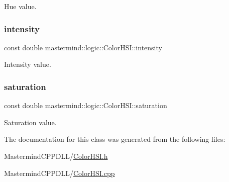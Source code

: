 Hue value. 

\hypertarget{classmastermind_1_1logic_1_1_color_h_s_i_acae1c5e74aae7a627bb1dbcd9f7ee521}{}\label{classmastermind_1_1logic_1_1_color_h_s_i_acae1c5e74aae7a627bb1dbcd9f7ee521} 
\subsubsection{\texorpdfstring{intensity}{intensity}}
{\footnotesize\ttfamily const double mastermind\+::logic\+::\+Color\+H\+S\+I\+::intensity\hspace{0.3cm}{\ttfamily [private]}}



Intensity value. 

\hypertarget{classmastermind_1_1logic_1_1_color_h_s_i_a004dfa3a87c92f9890a7fc64b6b08c8f}{}\label{classmastermind_1_1logic_1_1_color_h_s_i_a004dfa3a87c92f9890a7fc64b6b08c8f} 
\subsubsection{\texorpdfstring{saturation}{saturation}}
{\footnotesize\ttfamily const double mastermind\+::logic\+::\+Color\+H\+S\+I\+::saturation\hspace{0.3cm}{\ttfamily [private]}}



Saturation value. 



The documentation for this class was generated from the following files\+:\begin{DoxyCompactItemize}
\item 
Mastermind\+C\+P\+P\+D\+L\+L/\hyperlink{_color_h_s_i_8h}{Color\+H\+S\+I.\+h}\item 
Mastermind\+C\+P\+P\+D\+L\+L/\hyperlink{_color_h_s_i_8cpp}{Color\+H\+S\+I.\+cpp}\end{DoxyCompactItemize}
